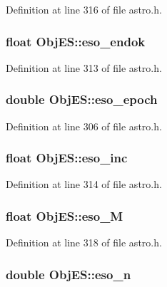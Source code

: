 Definition at line 316 of file astro.\-h.

\hypertarget{struct_obj_e_s_acdad5e0584580a009d4df491f5ddcaa3}{
\subsubsection[{eso\-\_\-endok}]{\setlength{\rightskip}{0pt plus 5cm}float Obj\-E\-S\-::eso\-\_\-endok}}\label{struct_obj_e_s_acdad5e0584580a009d4df491f5ddcaa3}


Definition at line 313 of file astro.\-h.

\hypertarget{struct_obj_e_s_a802b004e0f70e92b5f802e2180f8e148}{
\subsubsection[{eso\-\_\-epoch}]{\setlength{\rightskip}{0pt plus 5cm}double Obj\-E\-S\-::eso\-\_\-epoch}}\label{struct_obj_e_s_a802b004e0f70e92b5f802e2180f8e148}


Definition at line 306 of file astro.\-h.

\hypertarget{struct_obj_e_s_ae8b1d0cd54db2151a4f3abce93867e34}{
\subsubsection[{eso\-\_\-inc}]{\setlength{\rightskip}{0pt plus 5cm}float Obj\-E\-S\-::eso\-\_\-inc}}\label{struct_obj_e_s_ae8b1d0cd54db2151a4f3abce93867e34}


Definition at line 314 of file astro.\-h.

\hypertarget{struct_obj_e_s_ab1e0b35f063c6e34fa2a8e9bd917eecd}{
\subsubsection[{eso\-\_\-\-M}]{\setlength{\rightskip}{0pt plus 5cm}float Obj\-E\-S\-::eso\-\_\-\-M}}\label{struct_obj_e_s_ab1e0b35f063c6e34fa2a8e9bd917eecd}


Definition at line 318 of file astro.\-h.

\hypertarget{struct_obj_e_s_a0b9468f1fb373568988b87602681a7a1}{
\subsubsection[{eso\-\_\-n}]{\setlength{\rightskip}{0pt plus 5cm}double Obj\-E\-S\-::eso\-\_\-n}}\label{struct_obj_e_s_a0b9468f1fb373568988b87602681a7a1}


